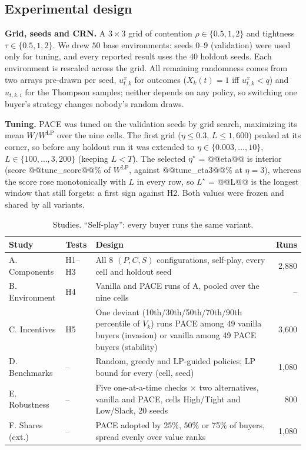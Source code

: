 \documentclass{article}
\newcommand{\WLP}{W^{\mathrm{LP}}}
\begin{document}
\subsection{Experimental design}
\label{sec:design}
\textbf{Grid, seeds and CRN.} A $3\times3$ grid of contention $\rho\in\{0.5,1,2\}$ and tightness $\tau\in\{0.5,1,2\}$. We drew $50$ base environments: seeds 0--9 (validation) were used only for tuning, and every reported result uses the $40$ holdout seeds. Each environment is rescaled across the grid. All remaining randomness comes from two arrays pre-drawn per seed, $u^x_{t,k}$ for outcomes ($X_k(t)=1$ iff $u^x_{t,k}<q$) and $u_{t,k,i}$ for the Thompson samples; neither depends on any policy, so switching one buyer's strategy changes nobody's random draws.

\textbf{Tuning.} PACE was tuned on the validation seeds by grid search, maximizing its mean $W/\WLP$ over the nine cells. The first grid ($\eta\le0.3$, $L\le1{,}600$) peaked at its corner, so before any holdout run it was extended to $\eta\in\{0.003,\dots,10\}$, $L\in\{100,\dots,3{,}200\}$ (keeping $L<T$). The selected $\eta^\star$ = @@eta@@ is interior (score @@tune_score@@\% of $\WLP$, against @@tune_eta3@@\% at $\eta=3$), whereas the score rose monotonically with $L$ in every row, so $L^\star$ = @@L@@ is the longest window that still forgets: a first sign against H2. Both values were frozen and shared by all variants.

\begin{table}[h]
\centering\small
\caption{Studies. ``Self-play'': every buyer runs the same variant.}
\label{tab:studies}
\begin{tabular}{@{}l l p{9.6cm} r@{}}
\toprule
\textbf{Study} & \textbf{Tests} & \textbf{Design} & \textbf{Runs}\\
\midrule
A. Components & H1--H3 & All 8 $(P,C,S)$ configurations, self-play, every cell and holdout seed & 2,880\\
B. Environment & H4 & Vanilla and PACE runs of A, pooled over the nine cells & --\\
C. Incentives & H5 & One deviant (10th/30th/50th/70th/90th percentile of $V_k$) runs PACE among 49 vanilla buyers (invasion) or vanilla among 49 PACE buyers (stability) & 3,600\\
D. Benchmarks & -- & Random, greedy and LP-guided policies; LP bound for every (cell, seed) & 1,080\\
E. Robustness & -- & Five one-at-a-time checks $\times$ two alternatives, vanilla and PACE, cells High/Tight and Low/Slack, 20 seeds & 800\\
F. Shares (ext.) & -- & PACE adopted by 25\%, 50\% or 75\% of buyers, spread evenly over value ranks & 1,080\\
\bottomrule
\end{tabular}
\end{table}
\end{document}
